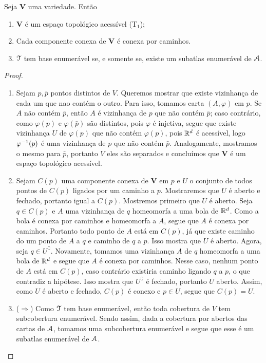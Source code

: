 \begin{prop}
Seja $\bm V$ uma variedade. Então
	\begin{enumerate}
	\item $\bm V$  é um espaço topológico acessível (T$_1$);
	\item Cada componente conexa de $\bm V$ é conexa por caminhos.
	\item $\mathcal{T}$ tem base enumerável se, e somente se, existe um subatlas enumerável de $\mathcal{A}$.
	\end{enumerate}
\end{prop}
\begin{proof}
	\begin{enumerate}
	\item Sejam $p,\bar p$ pontos distintos de $V$. Queremos mostrar que existe vizinhança de cada um que nao contém o outro. Para isso, tomamos carta $(A,\varphi)$ em $p$. Se $A$ não contém $\bar p$, então $A$ é vizinhança de $p$ que não contém $\bar p$; caso contrário, como $\varphi(p)$ e $\varphi(\bar p)$ são distintos, pois $\varphi$ é injetiva, segue que existe vizinhança $U$ de $\varphi(p)$ que não contém $\varphi(p)$, pois $\mathbb{R}^d$ é acessível, logo $\varphi^{-1}(p)$ é uma vizinhança de $p$ que não contém $\bar p$. Analogamente, mostramos o mesmo para $\bar p$, portanto $V$ eles são separados e concluímos que $\bm V$ é um espaço topológico acessível.
	
	\item Sejam $C(p)$ uma componente conexa de $\bm V$ em $p$ e $U$ o conjunto de todos pontos de $C(p)$ ligados por um caminho a $p$. Mostraremos que $U$ é aberto e fechado, portanto igual a $C(p)$. Mostremos primeiro que $U$ é aberto. Seja $q \in C(p)$ e $A$ uma vizinhança de $q$ homeomorfa a uma bola de $\mathbb{R}^d$. Como a bola é conexa por caminhos e homeomorfa a $A$, segue que $A$ é conexa por caminhos. Portanto todo ponto de $A$ está em $C(p)$, já que existe caminho do um ponto de $A$ a $q$ e caminho de $q$ a $p$. Isso mostra que $U$ é aberto. Agora, seja $q \in U^\complement$. Novamente, tomamos uma vizinhança $A$ de $q$ homeomorfa a uma bola de $\mathbb{R}^d$ e segue que $A$ é conexa por caminhos. Nesse caso, nenhum ponto de $A$ está em $C(p)$, caso contrário existiria caminho ligando $q$ a $p$, o que contradiz a hipótese. Isso mostra que $U^\complement$ é fechado, portanto $U$ aberto. Assim, como $U$ é aberto e fechado, $C(p)$ é conexo e $p \in U$, segue que $C(p)=U$.
	
	\item ($\Rightarrow$) Como $\mathcal{T}$ tem base enumerável, então toda cobertura de $V$ tem subcobertura enumerável. Sendo assim, dada a cobertura por abertos das cartas de $\mathcal{A}$, tomamos uma subcobertura enumerável e segue que esse é um subatlas enumerável de $\mathcal{A}$.


\end{enumerate}
\end{proof}
